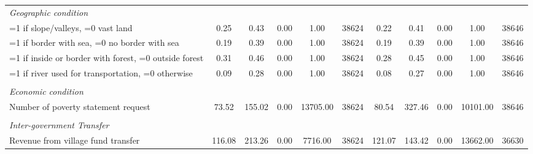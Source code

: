 \begin{tabular}{l*{2}{ccccc}}
\\ \emph{Geographic condition}&         &         &         &         &         &         &         &         &         &         \\
\hspace{0.25cm} =1 if slope/valleys, =0 vast land&     0.25&     0.43&     0.00&     1.00&    38624&     0.22&     0.41&     0.00&     1.00&    38646\\
\hspace{0.25cm} =1 if border with sea, =0 no border with sea&     0.19&     0.39&     0.00&     1.00&    38624&     0.19&     0.39&     0.00&     1.00&    38646\\
\hspace{0.25cm} =1 if inside or border with forest, =0 outside forest&     0.31&     0.46&     0.00&     1.00&    38624&     0.28&     0.45&     0.00&     1.00&    38646\\
\hspace{0.25cm} =1 if river used for transportation, =0 otherwise&     0.09&     0.28&     0.00&     1.00&    38624&     0.08&     0.27&     0.00&     1.00&    38646\\
\\ \emph{Economic condition}&         &         &         &         &         &         &         &         &         &         \\
\hspace{0.25cm} Number of poverty statement request&    73.52&   155.02&     0.00& 13705.00&    38624&    80.54&   327.46&     0.00& 10101.00&    38646\\
\\ \emph{Inter-government Transfer}&         &         &         &         &         &         &         &         &         &         \\
\hspace{0.25cm} Revenue from village fund transfer&   116.08&   213.26&     0.00&  7716.00&    38624&   121.07&   143.42&     0.00& 13662.00&    36630\\
\bottomrule
\end{tabular}
